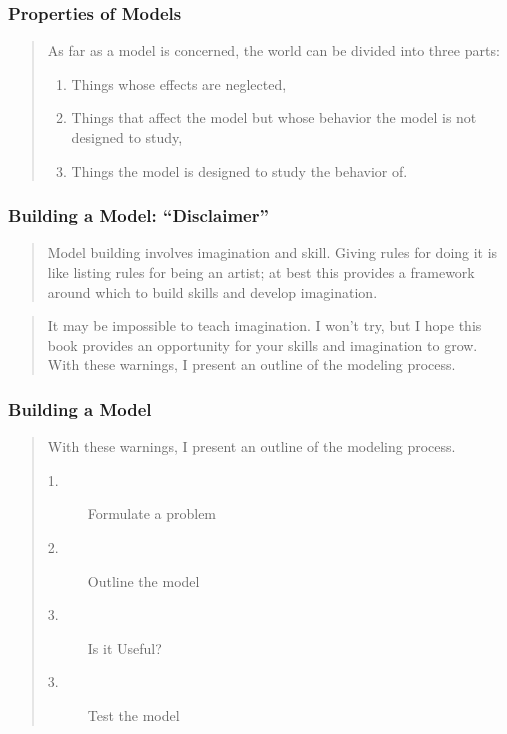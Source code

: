 \begin{frame}
    \frametitle{Properties of Models}
    \begin{verse}
    As far as a model is concerned, the world can be divided into three parts:
    \begin{enumerate}
        \item Things whose effects are neglected,
        \item Things that affect the model but whose behavior the model is not
            designed to study,
        \item Things the model is designed to study the behavior of. 
    \end{enumerate}
\end{verse}
\end{frame}

\begin{frame}
    \frametitle{Building a Model: ``Disclaimer''}
    \begin{verse}
        Model building involves imagination and skill. Giving rules for doing
        it is like listing rules for being an artist; at best this provides a
        framework around which to build skills and develop imagination. 
    \end{verse} 
    \begin{verse}
        It may
        be impossible to teach imagination. I won't try, but I hope this book
        provides an opportunity for your skills and imagination to grow. With
        these warnings, I present an outline of the modeling process.
    \end{verse}
\end{frame}


\begin{frame}
    \frametitle{Building a Model}
    \begin{verse}
        With these warnings, I present an outline of the modeling process.
    \begin{description}
        \item[1.] {Formulate a problem}
        \item[2.] {Outline the model}
        \item[3.] {Is it Useful?}
        \item[3.] {Test the model}
    \end{description}
    \end{verse}
\end{frame}

